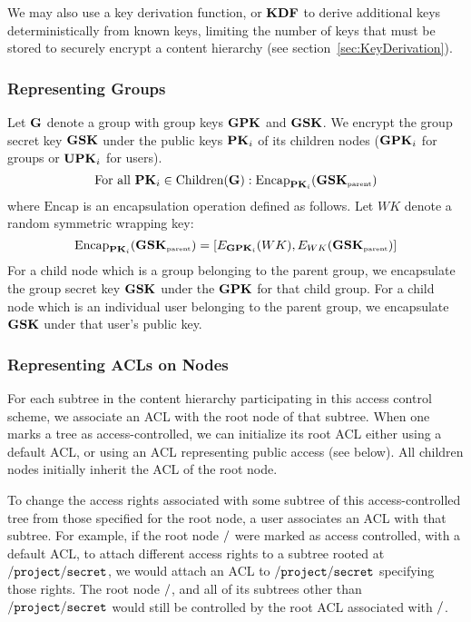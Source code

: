 We may also use a key derivation function, or ${\textbf{KDF}}$ to derive
additional keys deterministically from known keys, limiting the number
of keys that must be stored to securely encrypt a content hierarchy
(see section~\ref{sec:KeyDerivation}).

\subsubsection{Representing Groups}

Let ${\textbf{G}}$ denote a group with group keys ${\textbf{GPK}}$ and ${\textbf{GSK}}$. We encrypt
the group secret key ${\textbf{GSK}}$ under the public keys ${\textbf{PK}}_i$ of its
children nodes (${\textbf{GPK}}_i$ for groups or ${\textbf{UPK}}_i$ for users).
$$\mbox{For all } {\textbf{PK}}_i \in \mbox{Children}({\textbf{G}}): \mbox{Encap}_{{\textbf{PK}}_i}({\textbf{GSK}}_{\mbox{\tiny parent}})$$
where $\mbox{Encap}$ is an encapsulation operation defined as follows. Let $WK$ denote a random symmetric wrapping key:
$$\mbox{Encap}_{{\textbf{PK}}_i}({\textbf{GSK}}_{\mbox{\tiny parent}}) = [E_{{\textbf{GPK}}_i}(WK), E_{WK}({\textbf{GSK}}_{\mbox{\tiny parent}})]$$
For a child node which is a group belonging to the parent group, we
encapsulate the group secret key ${\textbf{GSK}}$ under the ${\textbf{GPK}}$ for that
child group. For a child node which is an individual user belonging to
the parent group, we encapsulate ${\textbf{GSK}}$ under that user's public key.

\subsubsection{Representing ACLs on Nodes}

For each subtree in the content hierarchy participating in this access
control scheme, we associate an ACL with the root node of that
subtree. When one marks a tree as access-controlled, we can initialize
its root ACL either using a default ACL, or using an ACL representing
public access (see below). All children nodes initially inherit the
ACL of the root node.

To change the access rights associated with some subtree of this
access-controlled tree from those specified for the root node, a user
associates an ACL with that subtree. For example, if the root node
$\ccnxpath{/}$ were marked as access controlled, with a default ACL,
to attach different access rights to a subtree rooted at
$\ccnxpath{/project/secret}$, we would attach an ACL to
$\ccnxpath{/project/secret}$ specifying those rights. The root node
$\ccnxpath{/}$, and all of its subtrees other than
$\ccnxpath{/project/secret}$ would still be controlled by the root ACL
associated with $\ccnxpath{/}$.

